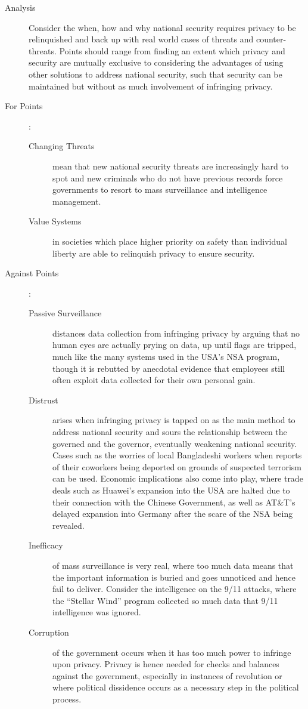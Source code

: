 \documentclass[../../main]{subfiles}
\begin{document}
\begin{description}
	\item[Analysis] Consider the when, how and why national security requires privacy to be relinquished and back up with real world cases of threats and counter-threats. Points should range from finding an extent which privacy and security are mutually exclusive to considering the advantages of using other solutions to address national security, such that security can be maintained but without as much involvement of infringing privacy.
	\item[For Points] :
		\begin{description}
			\item[Changing Threats] mean that new national security threats are increasingly hard to spot and new criminals who do not have previous records force governments to resort to mass surveillance and intelligence management.
			\item[Value Systems] in societies which place higher priority on safety than individual liberty are able to relinquish privacy to ensure security.
		\end{description}
	\item[Against Points] :
		\begin{description}
			\item[Passive Surveillance] distances data collection from infringing privacy by arguing that no human eyes are actually prying on data, up until flags are tripped, much like the many systems used in the USA's NSA program, though it is rebutted by anecdotal evidence that employees still often exploit data collected for their own personal gain.
			\item[Distrust] arises when infringing privacy is tapped on as the main method to address national security and sours the relationship between the governed and the governor, eventually weakening national security. Cases such as the worries of local Bangladeshi workers when reports of their coworkers being deported on grounds of suspected terrorism can be used. Economic implications also come into play, where trade deals such as Huawei's expansion into the USA are halted due to their connection with the Chinese Government, as well as AT\&T's delayed expansion into Germany after the scare of the NSA being revealed.
			\item[Inefficacy] of mass surveillance is very real, where too much data means that the important information is buried and goes unnoticed and hence fail to deliver. Consider the intelligence on the 9/11 attacks, where the ``Stellar Wind'' program collected so much data that 9/11 intelligence was ignored.
			\item[Corruption] of the government occurs when it has too much power to infringe upon privacy. Privacy is hence needed for checks and balances against the government, especially in instances of revolution or where political dissidence occurs as a necessary step in the political process. 
		\end{description}
\end{description}
\end{document}
